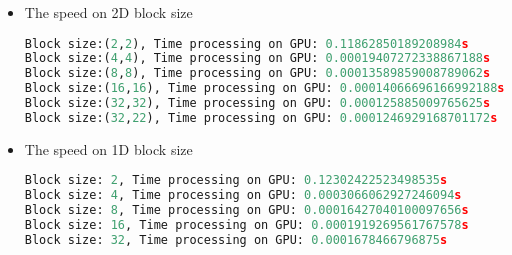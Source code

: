 \documentclass[12pt]{article}
\begin{document}
\begin{itemize}
    \item The speed on 2D block size
    \begin{lstlisting}[language=Python]
Block size:(2,2), Time processing on GPU: 0.11862850189208984s
Block size:(4,4), Time processing on GPU: 0.00019407272338867188s
Block size:(8,8), Time processing on GPU: 0.00013589859008789062s
Block size:(16,16), Time processing on GPU: 0.00014066696166992188s
Block size:(32,32), Time processing on GPU: 0.000125885009765625s
Block size:(32,22), Time processing on GPU: 0.0001246929168701172s
\end{lstlisting}
    \item  The speed on 1D block size
    \begin{lstlisting}[language=Python]
Block size: 2, Time processing on GPU: 0.12302422523498535s
Block size: 4, Time processing on GPU: 0.0003066062927246094s
Block size: 8, Time processing on GPU: 0.00016427040100097656s
Block size: 16, Time processing on GPU: 0.0001919269561767578s
Block size: 32, Time processing on GPU: 0.0001678466796875s
\end{lstlisting}

\end{itemize}
\end{document}
